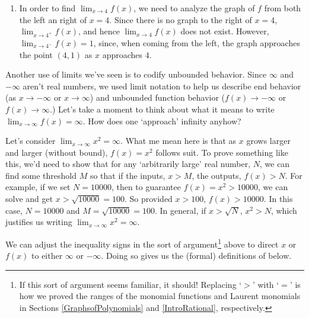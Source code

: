 \documentclass{ximera}
\begin{document}
\begin{example}
\begin{explanation}
\begin{enumerate}
\item In order to find  $\lim_{x \rightarrow 4} f(x)$, we need to analyze the graph of $f$ from both the left an right of $x=4$.  Since there is no graph to the right of $x = 4$,  $\lim_{x \rightarrow 4^{+}} f(x)$, and hence $\lim_{x \rightarrow 4} f(x)$ does not exist.  However, $\lim_{x \rightarrow 4^{-}} f(x) = 1$, since, when coming from the left, the graph approaches the point $(4,1)$ as $x$ approaches $4$.  


\end{enumerate}

\end{explanation}
\end{example}


Another use of limits we've seen is to codify unbounded behavior.  Since $\infty$ and $-\infty$ aren't real numbers,  we used limit notation to help us describe end behavior  (as $x \rightarrow - \infty$ or $x \rightarrow \infty$) and unbounded function behavior ($f(x)\rightarrow -\infty$ or $f(x) \rightarrow \infty$.)  Let's take a moment to think about what it means to write $\lim_{x \rightarrow \infty} f(x) = \infty$.  How does one `approach' infinity anyhow?  



Let's consider  $\lim_{x \rightarrow \infty} x^2 = \infty$.  What me mean here is that as $x$ grows larger and larger (without bound), $f(x) = x^2$ follows suit.  To prove something like this, we'd need to show that for any `arbitrarily large' real number, $N$, we can find some threshold $M$ so that if the inputs, $x>M$, the outputs, $f(x) > N$.  For example, if we set $N = 10000$, then to guarantee $f(x) = x^2 > 10000$, we can solve and get $x > \sqrt{10000} = 100$.  So provided $x > 100$, $f(x) > 10000$.  In this case, $N = 10000$ and $M = \sqrt{10000} = 100$.  In general, if $x > \sqrt{N}$, $x^2 > N$, which justifies us writing $\lim_{x \rightarrow \infty} x^2 = \infty$.



We can adjust the inequality signs in the sort of argument\footnote{If this sort of argument seems familiar, it should!  Replacing `$>$' with `$=$' is how we proved the ranges  of the monomial functions and Laurent monomials  in Sections \ref{GraphsofPolynomials} and \ref{IntroRational}, respectively.}   above to direct $x$ or $f(x)$ to either $\infty$ or $-\infty$.  Doing so gives us the (formal) definitions of below.




\end{document}
